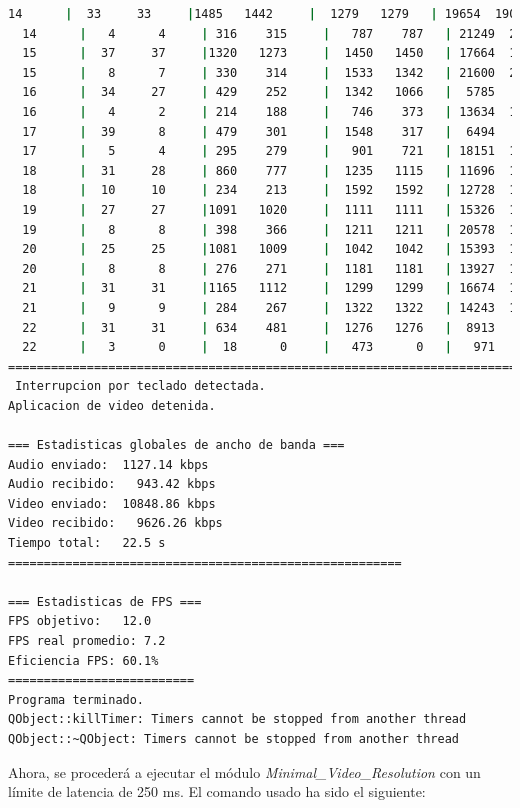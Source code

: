 \begin{lstlisting}[language=bash,basicstyle=\ttfamily\scriptsize]
  14      |  33     33     |1485   1442     |  1279   1279   | 19654  19087   |  30     70
  14      |   4      4     | 316    315     |   787    787   | 21249  21169   |  36     68
  15      |  37     37     |1320   1273     |  1450   1450   | 17664  17031   |  32     71
  15      |   8      7     | 330    314     |  1533   1342   | 21600  20552   |  40     71
  16      |  34     27     | 429    252     |  1342   1066   |  5785   3396   |  37     70
  16      |   4      2     | 214    188     |   746    373   | 13634  11976   |  34     72
  17      |  39      8     | 479    301     |  1548    317   |  6494   4081   |  41     71
  17      |   5      4     | 295    279     |   901    721   | 18151  17177   |  33     70
  18      |  31     28     | 860    777     |  1235   1115   | 11696  10571   |  35     78
  18      |  10     10     | 234    213     |  1592   1592   | 12728  11585   |  29     77
  19      |  27     27     |1091   1020     |  1111   1111   | 15326  14330   |  35     74
  19      |   8      8     | 398    366     |  1211   1211   | 20578  18912   |  32     71
  20      |  25     25     |1081   1009     |  1042   1042   | 15393  14369   |  28     69
  20      |   8      8     | 276    271     |  1181   1181   | 13927  13664   |  36     73
  21      |  31     31     |1165   1112     |  1299   1299   | 16674  15917   |  26     70
  21      |   9      9     | 284    267     |  1322   1322   | 14243  13399   |  35     69
  22      |  31     31     | 634    481     |  1276   1276   |  8913   6759   |  33     70
  22      |   3      0     |  18      0     |   473      0   |   971      0   |  19     68
============================================================================================
 Interrupcion por teclado detectada.
Aplicacion de video detenida.

=== Estadisticas globales de ancho de banda ===
Audio enviado:	1127.14 kbps
Audio recibido:   943.42 kbps
Video enviado:	10848.86 kbps
Video recibido:   9626.26 kbps
Tiempo total: 	22.5 s
=======================================================

=== Estadisticas de FPS ===
FPS objetivo: 	12.0
FPS real promedio: 7.2
Eficiencia FPS:	60.1%
==========================
Programa terminado.
QObject::killTimer: Timers cannot be stopped from another thread
QObject::~QObject: Timers cannot be stopped from another thread
\end{lstlisting}

\newpage

Ahora, se procederá a ejecutar el módulo \textit{Minimal\_Video\_Resolution} con un límite de latencia de 250 ms. El comando usado ha sido el siguiente:

